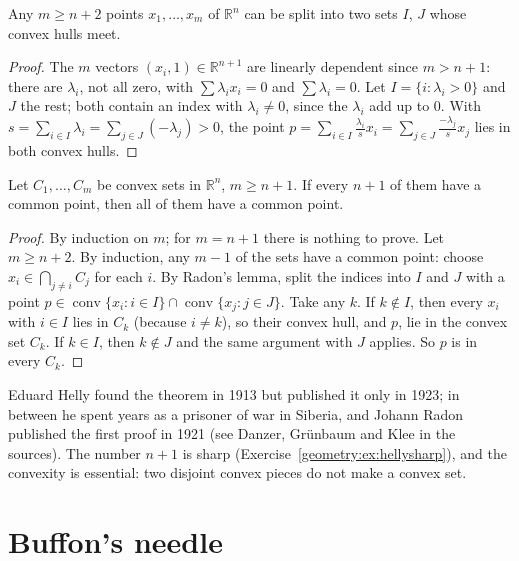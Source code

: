 \begin{lemma}[Radon, 1921]\label{geometry:lem:radon}
Any $m\ge n+2$ points $x_1,\dots,x_m$ of $\mathbb R^n$ can be split into two sets $I$, $J$ whose convex hulls meet.
\end{lemma}

\begin{proof}
The $m$ vectors $(x_i,1)\in\mathbb R^{n+1}$ are linearly dependent since $m>n+1$: there are $\lambda_i$, not all zero, with $\sum\lambda_ix_i=0$ and $\sum\lambda_i=0$.
Let $I=\{i:\lambda_i>0\}$ and $J$ the rest; both contain an index with $\lambda_i\ne0$, since the $\lambda_i$ add up to $0$. With
$s=\sum_{i\in I}\lambda_i=\sum_{j\in J}(-\lambda_j)>0$, the point $p=\sum_{i\in I}\frac{\lambda_i}sx_i=\sum_{j\in J}\frac{-\lambda_j}sx_j$ lies in both convex hulls.
\end{proof}

\begin{theorem}[Helly]\label{geometry:thm:helly}
Let $C_1,\dots,C_m$ be convex sets in $\mathbb R^n$, $m\ge n+1$. If every $n+1$ of them have a common point, then all of them have a common point.
\end{theorem}

\begin{proof}
By induction on $m$; for $m=n+1$ there is nothing to prove. Let $m\ge n+2$. By induction, any $m-1$ of the sets have a common point: choose
$x_i\in\bigcap_{j\ne i}C_j$ for each $i$. By Radon's lemma, split the indices into $I$ and $J$ with a point $p\in\operatorname{conv}\{x_i:i\in I\}\cap
\operatorname{conv}\{x_j:j\in J\}$. Take any $k$. If $k\notin I$, then every $x_i$ with $i\in I$ lies in $C_k$ (because $i\ne k$), so their convex hull, and $p$, lie in
the convex set $C_k$. If $k\in I$, then $k\notin J$ and the same argument with $J$ applies. So $p$ is in every $C_k$.
\end{proof}

Eduard Helly found the theorem in 1913 but published it only in 1923; in between he spent years as a prisoner of war in Siberia, and Johann Radon
published the first proof in 1921 (see Danzer, Gr\"unbaum and Klee in the sources). The number $n+1$ is sharp (Exercise~\ref{geometry:ex:hellysharp}), and the
convexity is essential: two disjoint convex pieces do not make a convex set.

\section{Buffon's needle}

